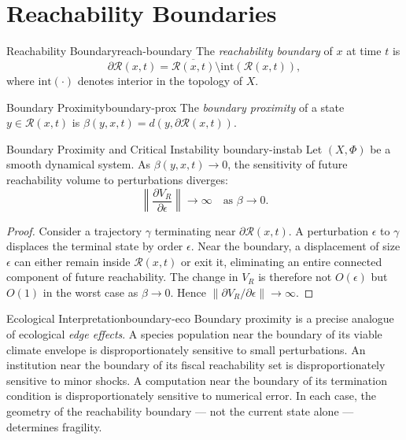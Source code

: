 \documentclass[12pt,twoside,openright]{book}
\newcommand{\reach}{\mathcal{R}}
\begin{document}
\section{Reachability Boundaries}
\label{sec:ch13-boundary}

\begin{definition}{Reachability Boundary}{reach-boundary}
  The \emph{reachability boundary} of $x$ at time $t$ is
  \[
    \partial\reach(x,t)
    = \overline{\reach(x,t)} \setminus
      \mathrm{int}(\reach(x,t)),
  \]
  where $\mathrm{int}(\cdot)$ denotes interior in the
  topology of $X$.
\end{definition}

\begin{definition}{Boundary Proximity}{boundary-prox}
  The \emph{boundary proximity} of a state
  $y\in\reach(x,t)$ is
  $\beta(y,x,t) = d(y,\partial\reach(x,t))$.
\end{definition}

\begin{theorem}{Boundary Proximity and Critical Instability}%
  {boundary-instab}
  Let $(X,\Phi)$ be a smooth dynamical system. As
  $\beta(y,x,t)\to0$, the sensitivity of future
  reachability volume to perturbations diverges:
  \[
    \left\|\frac{\partial V_R}{\partial\epsilon}\right\|
    \to \infty \quad \text{as } \beta \to 0.
  \]
\end{theorem}

\begin{proof}
  Consider a trajectory $\gamma$ terminating near
  $\partial\reach(x,t)$. A perturbation $\epsilon$ to
  $\gamma$ displaces the terminal state by order $\epsilon$.
  Near the boundary, a displacement of size $\epsilon$ can
  either remain inside $\reach(x,t)$ or exit it, eliminating
  an entire connected component of future reachability. The
  change in $V_R$ is therefore not $O(\epsilon)$ but $O(1)$
  in the worst case as $\beta\to0$. Hence
  $\|\partial V_R/\partial\epsilon\|\to\infty$.
\end{proof}

\begin{remark}{Ecological Interpretation}{boundary-eco}
  Boundary proximity is a precise analogue of ecological
  \emph{edge effects}. A species population near the
  boundary of its viable climate envelope is
  disproportionately sensitive to small perturbations. An
  institution near the boundary of its fiscal reachability
  set is disproportionately sensitive to minor shocks. A
  computation near the boundary of its termination condition
  is disproportionately sensitive to numerical error. In
  each case, the geometry of the reachability boundary ---
  not the current state alone --- determines fragility.
\end{remark}
\end{document}
